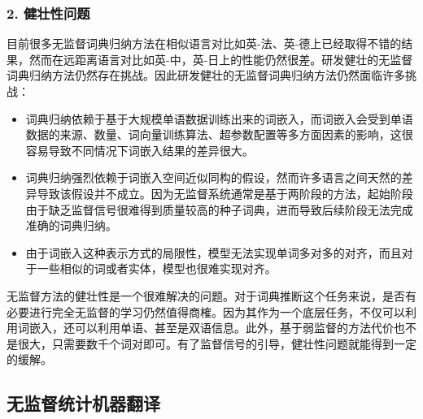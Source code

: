 \subsubsection{2. 健壮性问题}

\parinterval 目前很多无监督词典归纳方法在相似语言对比如英-法、英-德上已经取得不错的结果，然而在远距离语言对比如英-中，英-日上的性能仍然很差。研发健壮的无监督词典归纳方法仍然存在挑战。因此研发健壮的无监督词典归纳方法仍然面临许多挑战：

\begin{itemize}
\vspace{0.5em}
\item 词典归纳依赖于基于大规模单语数据训练出来的词嵌入，而词嵌入会受到单语数据的来源、数量、词向量训练算法、超参数配置等多方面因素的影响，这很容易导致不同情况下词嵌入结果的差异很大。
\vspace{0.5em}

\item 词典归纳强烈依赖于词嵌入空间近似同构的假设，然而许多语言之间天然的差异导致该假设并不成立。因为无监督系统通常是基于两阶段的方法，起始阶段由于缺乏监督信号很难得到质量较高的种子词典，进而导致后续阶段无法完成准确的词典归纳。
\vspace{0.5em}

\item 由于词嵌入这种表示方式的局限性，模型无法实现单词多对多的对齐，而且对于一些相似的词或者实体，模型也很难实现对齐。
\vspace{0.5em}
\end{itemize}

\parinterval 无监督方法的健壮性是一个很难解决的问题。对于词典推断这个任务来说，是否有必要进行完全无监督的学习仍然值得商榷。因为其作为一个底层任务，不仅可以利用词嵌入，还可以利用单语、甚至是双语信息。此外，基于弱监督的方法代价也不是很大，只需要数千个词对即可。有了监督信号的引导，健壮性问题就能得到一定的缓解。


\subsection{无监督统计机器翻译}

